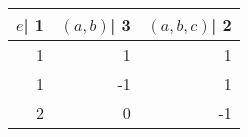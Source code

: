 \begin{tabular}{rrr}
\toprule
 $e$| 1 &  $(a, b)$| 3 &  $(a, b, c)$| 2 \\
\midrule
      1 &            1 &               1 \\
      1 &           -1 &               1 \\
      2 &            0 &              -1 \\
\bottomrule
\end{tabular}
